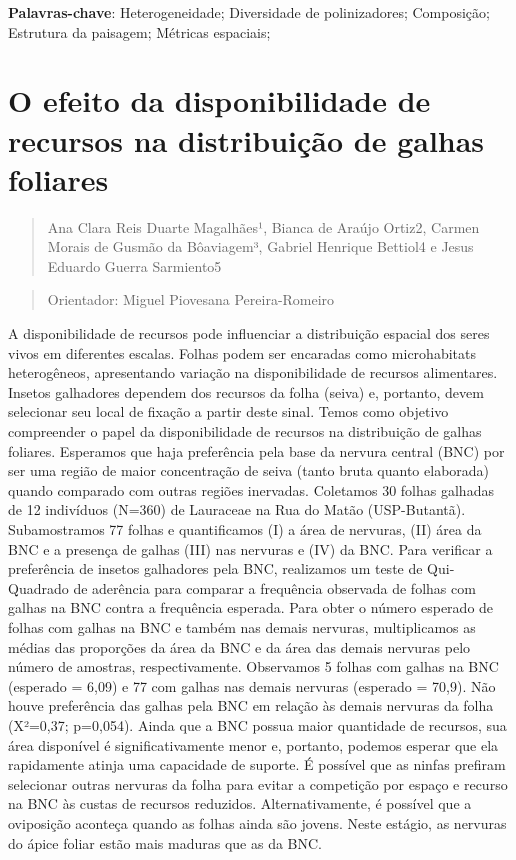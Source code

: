 \documentclass[
]{book}
\begin{document}
\textbf{Palavras-chave}: Heterogeneidade; Diversidade de polinizadores; Composição; Estrutura da paisagem; Métricas espaciais;

\chapter{O efeito da disponibilidade de recursos na distribuição de galhas foliares}\label{o-efeito-da-disponibilidade-de-recursos-na-distribuiuxe7uxe3o-de-galhas-foliares}

\begin{quote}
Ana Clara Reis Duarte Magalhães¹, Bianca de Araújo Ortiz2, Carmen Morais de Gusmão da Bôaviagem³, Gabriel Henrique Bettiol4 e Jesus Eduardo Guerra Sarmiento5
\end{quote}

\begin{quote}
Orientador: Miguel Piovesana Pereira-Romeiro
\end{quote}

A disponibilidade de recursos pode influenciar a distribuição espacial dos seres vivos em diferentes escalas. Folhas podem ser encaradas como microhabitats heterogêneos, apresentando variação na disponibilidade de recursos alimentares. Insetos galhadores dependem dos recursos da folha (seiva) e, portanto, devem selecionar seu local de fixação a partir deste sinal. Temos como objetivo compreender o papel da disponibilidade de recursos na distribuição de galhas foliares. Esperamos que haja preferência pela base da nervura central (BNC) por ser uma região de maior concentração de seiva (tanto bruta quanto elaborada) quando comparado com outras regiões inervadas. Coletamos 30 folhas galhadas de 12 indivíduos (N=360) de Lauraceae na Rua do Matão (USP-Butantã). Subamostramos 77 folhas e quantificamos (I) a área de nervuras, (II) área da BNC e a presença de galhas (III) nas nervuras e (IV) da BNC. Para verificar a preferência de insetos galhadores pela BNC, realizamos um teste de Qui-Quadrado de aderência para comparar a frequência observada de folhas com galhas na BNC contra a frequência esperada. Para obter o número esperado de folhas com galhas na BNC e também nas demais nervuras, multiplicamos as médias das proporções da área da BNC e da área das demais nervuras pelo número de amostras, respectivamente. Observamos 5 folhas com galhas na BNC (esperado = 6,09) e 77 com galhas nas demais nervuras (esperado = 70,9). Não houve preferência das galhas pela BNC em relação às demais nervuras da folha (X²=0,37; p=0,054). Ainda que a BNC possua maior quantidade de recursos, sua área disponível é significativamente menor e, portanto, podemos esperar que ela rapidamente atinja uma capacidade de suporte. É possível que as ninfas prefiram selecionar outras nervuras da folha para evitar a competição por espaço e recurso na BNC às custas de recursos reduzidos. Alternativamente, é possível que a oviposição aconteça quando as folhas ainda são jovens. Neste estágio, as nervuras do ápice foliar estão mais maduras que as da BNC.
\end{document}
